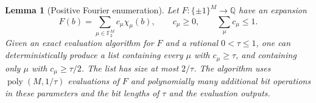\documentclass[letterpaper,11pt]{article}
\newtheorem{lemma}[theorem]{Lemma}
\theoremstyle{definition}
\newcommand{\F}{\mathbb F}
\DeclareMathOperator{\poly}{poly}
\begin{document}
\begin{lemma}[Positive Fourier enumeration]
\label{lem:heavy-fourier}
Let $F:\{\pm1\}^M\to\mathbb{Q}$ have an expansion
\begin{equation}
  F(b)=\sum_{\mu\in\F_2^M}c_\mu\chi_\mu(b),
  \qquad c_\mu\geq0,
  \qquad\sum_\mu c_\mu\leq1.
  \label{ex:positive-fourier}
\end{equation}
Given an exact evaluation algorithm for $F$ and a rational
$0<\tau\leq1$, one can deterministically produce a list containing
every $\mu$ with $c_\mu\geq\tau$, and containing only $\mu$ with
$c_\mu\geq\tau/2$.  The list has size at most $2/\tau$.
The algorithm uses $\poly(M,1/\tau)$ evaluations of $F$ and polynomially
many additional bit operations in these parameters and the bit lengths
of $\tau$ and the evaluation outputs.
\end{lemma}
\end{document}
